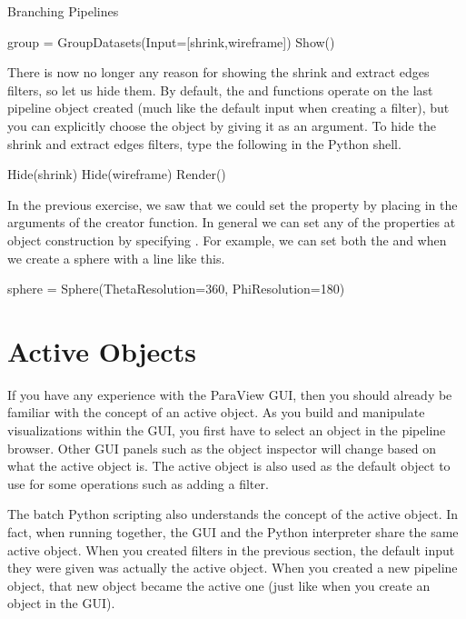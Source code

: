 \begin{exercise}{Branching Pipelines}
  \begin{python}
group = GroupDatasets(Input=[shrink,wireframe])
Show()
  \end{python}

  There is now no longer any reason for showing the shrink and extract
  edges filters, so let us hide them.  By default, the  and
   functions operate on the last pipeline object created (much
  like the default input when creating a filter), but you can explicitly
  choose the object by giving it as an argument.  To hide the shrink and
  extract edges filters, type the following in the Python shell.

  \begin{python}
Hide(shrink)
Hide(wireframe)
Render()
  \end{python}
\end{exercise}

In the previous exercise, we saw that we could set the 
property by placing  in the arguments
of the creator function.  In general we can set any of the properties at
object construction by specifying .  For example, we can set both the
 and  when we create a sphere
with a line like this.

\begin{python}
sphere = Sphere(ThetaResolution=360, PhiResolution=180)
\end{python}


\section{Active Objects}
\label{sec:ActiveObjects}

If you have any experience with the ParaView GUI, then you should already
be familiar with the concept of an active object.  As you build and
manipulate visualizations within the GUI, you first have to select an
object in the pipeline browser.  Other GUI panels such as the object
inspector will change based on what the active object is.  The active
object is also used as the default object to use for some operations such
as adding a filter.

The batch Python scripting also understands the concept of the active
object.  In fact, when running together, the GUI and the Python interpreter
share the same active object.  When you created filters in the previous
section, the default input they were given was actually the active object.
When you created a new pipeline object, that new object became the active
one (just like when you create an object in the GUI).

